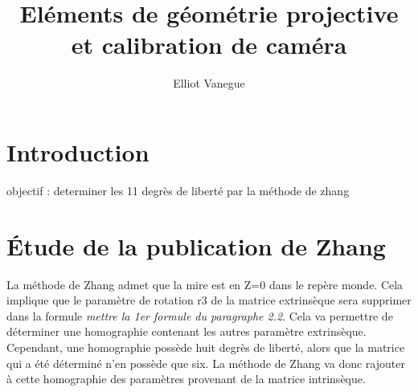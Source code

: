 \documentclass[a4paper,10pt]{article}
\title{Eléments de géométrie projective et calibration de caméra}
\author{Elliot Vanegue}
\begin{document}
\maketitle

\section{Introduction}
objectif : determiner les 11 degrès de liberté par la méthode de zhang

\section{Étude de la publication de Zhang}
La méthode de Zhang admet que la mire est en Z=0 dans le repère monde. Cela
implique que le paramètre de rotation r3 de la matrice extrinsèque sera supprimer dans la formule
\textit{mettre la 1er formule du paragraphe 2.2}. Cela va permettre de déterminer une homographie contenant les autres
paramètre extrinsèque.
Cependant, une homographie possède huit degrès de liberté, alors que la matrice qui a été déterminé
n'en possède que six. La méthode de Zhang va donc rajouter à cette homographie des paramètres provenant
de la matrice intrinsèque.
\end{document}
